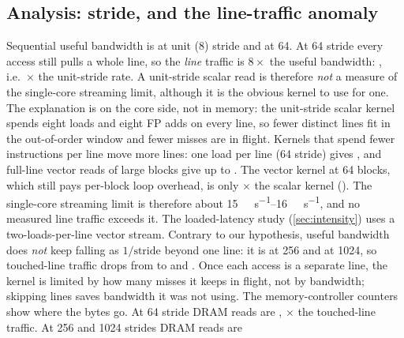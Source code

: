 \subsection{Analysis: stride, and the line-traffic anomaly}
Sequential useful bandwidth is  at unit (\qty{8}{\byte})
stride and  at \qty{64}{\byte}. At \qty{64}{\byte} stride
every access still pulls a whole line, so the \emph{line} traffic is $8\times$ the useful bandwidth:
, i.e.\ $\times$ the
unit-stride rate. A unit-stride scalar read is therefore \emph{not} a measure of the single-core
streaming limit, although it is the obvious kernel to use for one. The
explanation is on the core side, not in memory: the unit-stride scalar kernel spends eight loads and eight
FP adds on every line, so fewer distinct lines fit in the out-of-order window and fewer misses are in
flight. Kernels that spend fewer instructions per line move more lines: one load per line
(\qty{64}{\byte} stride) gives , and full-line vector
reads of large blocks give up to . The vector kernel at
\qty{64}{\byte} blocks, which still pays per-block loop overhead, is only $\times$
the scalar kernel (). The single-core streaming limit is
therefore about \qtyrange{15}{16}{\gibi\byte\per\second}, and no measured line traffic exceeds it. The
loaded-latency study (\cref{sec:intensity}) uses a two-loads-per-line vector stream. Contrary to our hypothesis, useful bandwidth does \emph{not} keep falling as
$1/\text{stride}$ beyond one line: it is  at
\qty{256}{\byte} and  at \qty{1024}{\byte}, so touched-line
traffic drops from  to
 and .
Once each access is a separate line, the kernel is limited by how many misses it keeps in flight, not by
bandwidth; skipping lines saves bandwidth it was not using. The memory-controller counters show where the bytes go. At \qty{64}{\byte} stride DRAM reads are
, $\times$ the
touched-line traffic. At \qty{256}{\byte} and \qty{1024}{\byte} strides DRAM reads are
